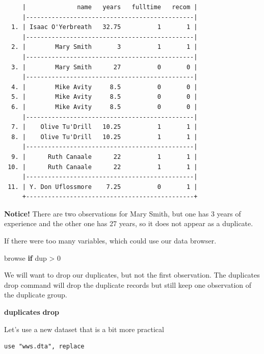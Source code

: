 \documentclass[
]{book}
\newenvironment{Shaded}{\begin{snugshade}}{\end{snugshade}}
\newcommand{\KeywordTok}[1]{\textcolor[rgb]{0.13,0.29,0.53}{\textbf{#1}}}
\newcommand{\NormalTok}[1]{#1}
\begin{document}
\begin{verbatim}
     |              name   years   fulltime   recom |
     |----------------------------------------------|
  1. | Isaac O'Yerbreath   32.75          1       1 |
     |----------------------------------------------|
  2. |        Mary Smith       3          1       1 |
     |----------------------------------------------|
  3. |        Mary Smith      27          0       0 |
     |----------------------------------------------|
  4. |        Mike Avity     8.5          0       0 |
  5. |        Mike Avity     8.5          0       0 |
  6. |        Mike Avity     8.5          0       0 |
     |----------------------------------------------|
  7. |    Olive Tu'Drill   10.25          1       1 |
  8. |    Olive Tu'Drill   10.25          1       1 |
     |----------------------------------------------|
  9. |      Ruth Canaale      22          1       1 |
 10. |      Ruth Canaale      22          1       1 |
     |----------------------------------------------|
 11. | Y. Don Uflossmore    7.25          0       1 |
     +----------------------------------------------+
\end{verbatim}

\textbf{Notice!} There are two observations for Mary Smith, but one has 3 years of experience and the other one has 27 years, so it does not appear as a duplicate.

If there were too many variables, which could use our data browser.

\begin{Shaded}
\begin{Highlighting}[]
\NormalTok{browse }\KeywordTok{if}\NormalTok{ dup \textgreater{} 0}
\end{Highlighting}
\end{Shaded}

We will want to drop our duplicates, but not the first observation. The duplicates drop command will drop the duplicate records but still keep one observation of the duplicate group.

\begin{Shaded}
\begin{Highlighting}[]
\KeywordTok{duplicates} \KeywordTok{drop}
\end{Highlighting}
\end{Shaded}

Let's use a new dataset that is a bit more practical

\begin{verbatim}
use "wws.dta", replace
\end{verbatim}
\end{document}
